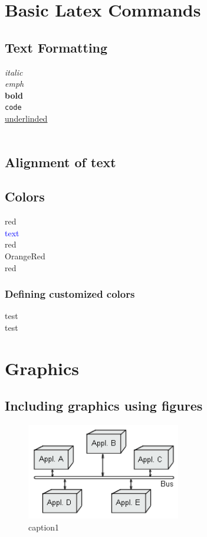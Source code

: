 \documentclass[12pt]{article}
\begin{document}
\section{Basic Latex Commands}
\subsection{Text Formatting}
\textit{italic} \\
\emph{emph} \\
\textbf{bold} \\
\texttt{code} \\
\underline{underlinded} \\
 \\
\subsection{Alignment of text}

\subsection{Colors}
\color{red} 
red \\
\textcolor{blue}{text} \\
red \\
\color{OrangeRed} OrangeRed \\
\color{black} red \\
\subsubsection{Defining customized colors}
\color{rgb} test \\
\color{dark-gray} test
\color{black} 
\newpage
\section{Graphics}
\subsection{Including graphics using figures}
\begin{figure}[here!]
\centering
\includegraphics[width=0.6\textwidth]{images/eai2.png}
\caption{caption1}
\end{figure}
\listoffigures
\newpage
\end{document}
